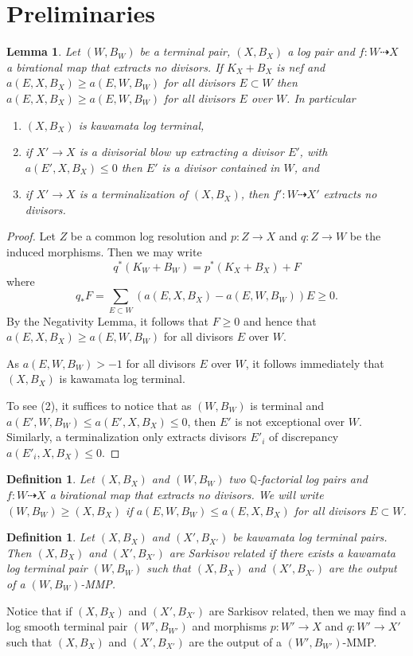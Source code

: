 \documentclass[12pt]{amsart}
\theoremstyle{plain}
\newtheorem{lemma}[theorem]{Lemma}
\newtheorem{definition}[theorem]{Definition}
\newcommand\Q{{\mathbb{Q}}}
\begin{document}
\section{Preliminaries}

\begin{lemma}\label{l-2} Let $(W,B_W)$ be a terminal pair, $(X,B_X)$ a log 
pair and $f:W\dasharrow X$ a birational map that extracts no 
divisors. If $K_X+B_X$ is nef and
$a(E,X,B_X)\geq a(E,W,B_{W})$ for all divisors $E\subset W$
then $a(E,X,B_X)\geq a(E,W,B_{W})$ for all divisors $E$ over $W$.
In particular \begin{enumerate}
\item$(X,B_X)$ is kawamata log terminal,
\item if $X'\to X$ is a divisorial blow up extracting a divisor $E'$,
with $a(E',X,B_X)\leq 0$ then $E'$ is a divisor contained in $W$, and 
\item if $X'\to X$ is a terminalization of $(X,B_X)$, then $f':W\dasharrow X'$ extracts
no divisors.
\end{enumerate}
\end{lemma}
\begin{proof} Let $Z$ be a common log resolution and $p:Z\to X$ and $q:Z\to W$
be the induced morphisms. Then we may write
$$q^*(K_W+B_W)=p^*(K_X+B_X)+F$$ where $$q_*F=\sum _{E\subset W}(a(E,X,B_X)-a(E,W,B_W))E\geq 0.$$ By the Negativity Lemma, it follows that
$F\geq 0$ and hence that $a(E,X,B_X)\geq a(E,W,B_{W})$ for all divisors $E$ over $W$. 

As $a(E,W,B_{W})>-1$ for all divisors $E$ over $W$, it follows 
immediately that $(X,B_X)$ is kawamata log terminal.

To see (2), it suffices to notice that 
as $(W,B_W)$ is terminal and $a(E',W,B_W)\leq a(E',X,B_X)\leq 0$, then
$E'$ is not exceptional over $W$. Similarly, a terminalization only extracts divisors $E'_i$ of
discrepancy $a(E'_i,X,B_X)\leq 0$.
\end{proof}
\begin{definition}\label{d-1} Let $(X,B_X)$ and $(W,B_W)$ two $\Q$-factorial log pairs and $f:W\dasharrow X$ a birational map that extracts no divisors. We will write
$(W,B_W)\geq (X,B_X)$ if 
$a(E,W,B_W)\leq a(E,X,B_X)$ for all divisors $E\subset W$.
\end{definition}
\begin{definition}Let $(X,B_X)$ and $(X',B_{X'})$ be kawamata log terminal pairs. Then $(X,B_X)$ and $(X',B_{X'})$ are Sarkisov related if there exists a 
kawamata log terminal pair $(W,B_W)$ such that $(X,B_X)$ and $(X',B_{X'})$ are
the output of a $(W,B_W)$-MMP.\end{definition}
Notice that if $(X,B_X)$ and $(X',B_{X'})$ are Sarkisov related, then
we may find a log smooth terminal pair
$(W',B_{W'})$ and morphisms $p:W'\to X$ and $q:W'\to X'$ such that $(X,B_X)$ and $(X',B_{X'})$ are
the output of a $(W',B_{W'})$-MMP.
\end{document}
